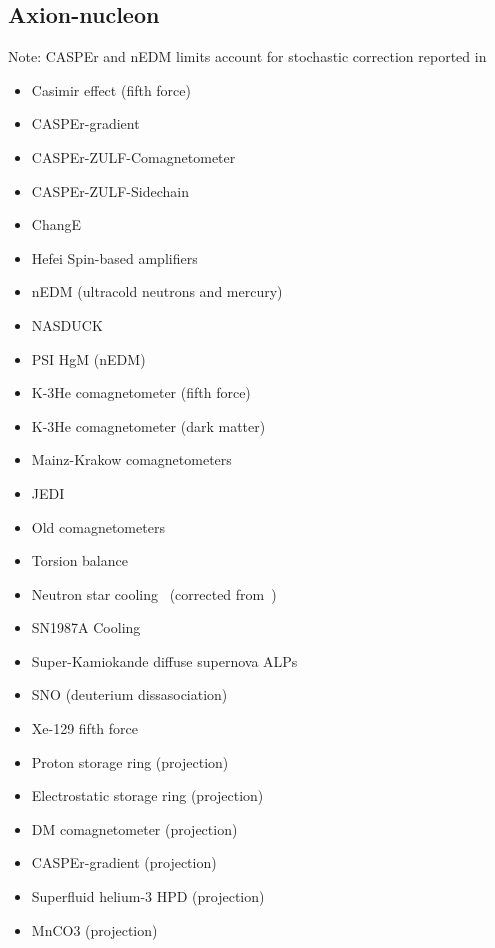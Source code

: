 \documentclass[8pt,twocolumn]{extarticle}
\begin{document}
\begin{mdframed}
\vspace{-1em}
\section{Axion-nucleon}\vspace{-0.5em}
Note: CASPEr and nEDM limits account for stochastic correction reported in~\cite{Centers:2019dyn}
\begin{itemize}\setlength\itemsep{-0.5em}
	\item Casimir effect (fifth force)~\cite{Mostepanenko:2020lqe}
	\item CASPEr-gradient~\cite{Walter:2025ldb}
    \item CASPEr-ZULF-Comagnetometer~\cite{Wu:2019exd}
    \item CASPEr-ZULF-Sidechain~\cite{Garcon:2019inh}
   \item ChangE~\cite{Wei:2023rzs,Xu:2023}
   \item Hefei Spin-based amplifiers~\cite{Jiang:2021dby}
    \item nEDM (ultracold neutrons and mercury)~\cite{Abel:2017rtm}
    \item NASDUCK~\cite{Bloch:2021vnn,Bloch:2022kjm}
    \item PSI HgM (nEDM)~\cite{Abel:2022vfg}
    \item K-3He comagnetometer (fifth force)~\cite{Vasilakis2009}
    \item K-3He comagnetometer (dark matter)~\cite{Lee:2022vvb}
    \item Mainz-Krakow comagnetometers~\cite{Gavilan-Martin:2024nlo}
    	\item JEDI~\cite{JEDI:2022hxa}
    \item Old comagnetometers~\cite{Bloch:2019lcy}
    \item Torsion balance~\cite{Adelberger:2006dh}
    \item Neutron star cooling~\cite{Buschmann:2021juv} (corrected from~\cite{Beznogov:2018fda})
    \item SN1987A Cooling~\cite{Carenza:2019pxu,Lella:2023bfb}
    \item Super-Kamiokande diffuse supernova ALPs~\cite{Alonso-Gonzalez:2024ems}
    \item SNO (deuterium dissasociation)~\cite{Bhusal:2020bvx}
    \item Xe-129 fifth force~\cite{Su:2024}
    \item Proton storage ring (projection)~\cite{Graham:2020kai}
    \item Electrostatic storage ring (projection)~\cite{Brandenstein:2022eif}
    \item DM comagnetometer (projection)~\cite{Bloch:2019lcy}
    \item CASPEr-gradient (projection)~\cite{Garcon:2019inh}

    \item Superfluid helium-3 HPD (projection)~\cite{Gao:2022nuq}
    \item MnCO3 (projection)~\cite{Chigusa:2023hmz}
\end{itemize}
\end{mdframed}
\end{document}
